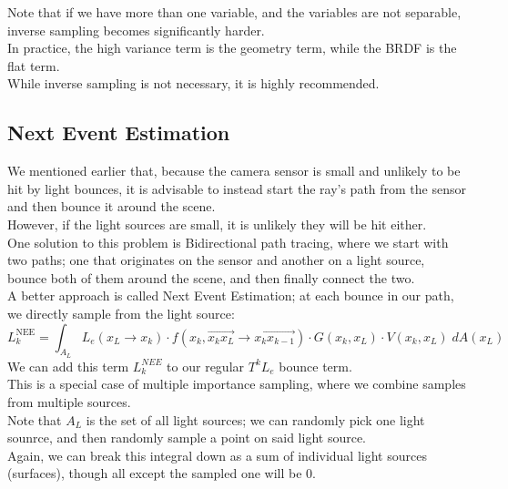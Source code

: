 \documentclass[12pt]{article}
\begin{document}
Note that if we have more than one variable,
and the variables are not separable,
inverse sampling becomes significantly harder. \\

In practice, the high variance term is
the geometry term, while the BRDF is the flat term. \\

While inverse sampling is not necessary, 
it is highly recommended. \\

\newpage

\subsection*{Next Event Estimation}

We mentioned earlier that, because the camera
sensor is small and unlikely to be hit by light
bounces, it is advisable to instead start the
ray's path from the sensor and then bounce
it around the scene. \\

However, if the light sources are small, it is unlikely
they will be hit either. \\

One solution to this problem is Bidirectional path
tracing, where we start with two paths;
one that originates on the sensor and another on
a light source, bounce both of them around the scene,
and then finally connect the two. \\

A better approach is called Next Event Estimation;
at each bounce in our path, we directly sample
from the light source:
\[ L_k^{\text{NEE}} = \int_{A_L} 
L_e(x_L \to x_k) \cdot 
f(x_k, \overrightarrow{x_k x_L} \to 
\overrightarrow{x_k x_{k-1}}) \cdot 
G(x_k, x_L) \cdot 
V(x_k, x_L) \; dA(x_L) \]
We can add this term $L_k^{NEE}$
to our regular $T^k L_e$ bounce term. \\

This is a special case of multiple importance sampling,
where we combine samples from multiple sources. \\

Note that $A_L$ is the set of all light sources;
we can randomly pick one light sounrce, and then
randomly sample a point on said light source. \\
Again, we can break this integral down
as a sum of individual light sources (surfaces),
though all except the sampled one will be $0$. \\
\end{document}

